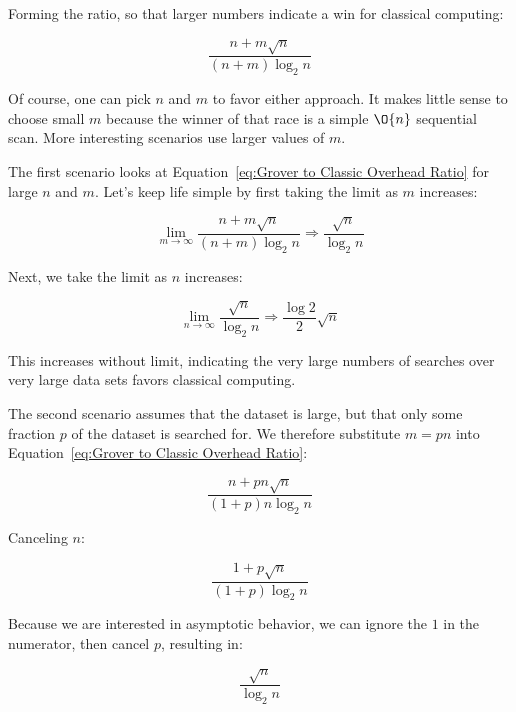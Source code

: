Forming the ratio, so that larger numbers indicate a win for classical
computing:

\begin{equation}
	\frac{n + m \sqrt n}{\left( n + m \right) \log_2 n}
\label{eq:Grover to Classic Overhead Ratio}
\end{equation}

Of course, one can pick $n$ and $m$ to favor either approach.
It makes little sense to choose small $m$ because the winner of that
race is a simple $\O{n}$ sequential scan.
More interesting scenarios use larger values of $m$.

The first scenario looks at
Equation~\ref{eq:Grover to Classic Overhead Ratio}
for large $n$ and $m$.
Let's keep life simple by first taking the limit as $m$ increases:

\begin{equation}
	\lim_{m\to\infty} \frac{n + m \sqrt n}{\left( n + m \right) \log_2 n}
	\Rightarrow \frac{\sqrt n}{\log_2 n}
\label{eq:sqrt n by log 2 n}
\end{equation}

Next, we take the limit as $n$ increases:

\begin{equation}
	\lim_{n\to\infty} \frac{\sqrt n}{\log_2 n}
	\Rightarrow \frac{\log 2}{2} \sqrt n
\end{equation}

This increases without limit, indicating the very large numbers of searches
over very large data sets favors classical computing.

The second scenario assumes that the dataset is large, but that only
some fraction $p$ of the dataset is searched for.
We therefore substitute $m = pn$ into
Equation~\ref{eq:Grover to Classic Overhead Ratio}:

\begin{equation}
	\frac{n + p n \sqrt n}{\left( 1 + p \right) n \log_2 n}
\end{equation}

Canceling $n$:

\begin{equation}
	\frac{1 + p \sqrt n}{\left( 1 + p \right) \log_2 n}
\end{equation}

Because we are interested in asymptotic behavior, we can ignore the
$1$ in the numerator, then cancel $p$, resulting in:

\begin{equation}
	\frac{\sqrt n}{\log_2 n}
\end{equation}

